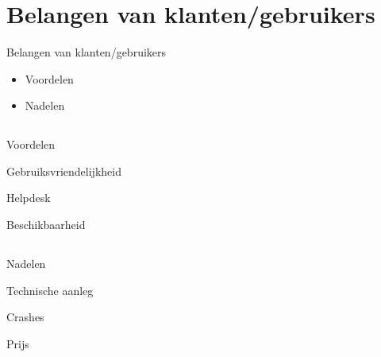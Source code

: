 \documentclass{beamer}
\begin{document}

    

\section[Klant]{Belangen van klanten/gebruikers}
\begin{frame}{Belangen van klanten/gebruikers}
     \begin{itemize}
         \item Voordelen 
         \item Nadelen
    \end{itemize} 
\end{frame}
     \subsection{}
    \begin{frame}{Voordelen}
        \begin{itemsize}
            \item Gebruiksvriendelijkheid
             \item Helpdesk
             \item Beschikbaarheid
        \end{itemsize}
    \end{frame}
    \subsection{}
    \begin{frame}{Nadelen}
        \begin{itemsize}
            \item Technische aanleg
            \item Crashes
            \item Prijs
        \end{itemsize}
    \end{frame}
    
\end{document}
